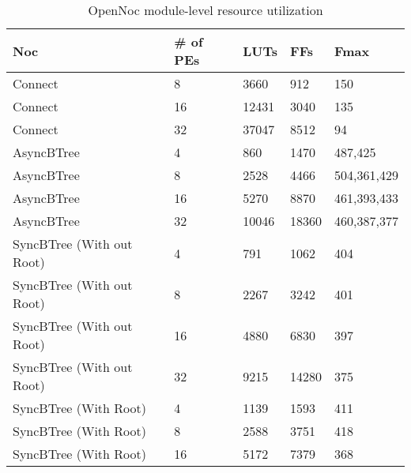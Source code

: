 \begin{table}[!t]
  \centering
  \caption{OpenNoc module-level resource utilization} 
  \begin{tabular}{l|l|l|l|l}
      \toprule
      Noc & \# of PEs & LUTs & FFs & Fmax \\
      \midrule
      \midrule
      Connect & 8      & 3660 & 912 & 150  \\
      Connect & 16     & 12431 & 3040 & 135 \\
      Connect & 32     & 37047 & 8512 & 94 \\    
      \midrule
      AsyncBTree & 4         & 860  & 1470 & 487,425\\
      AsyncBTree & 8         & 2528 & 4466 & 504,361,429\\
      AsyncBTree & 16        & 5270 & 8870 & 461,393,433 \\
      AsyncBTree & 32        & 10046 & 18360 & 460,387,377\\
      \midrule
      SyncBTree (With out Root) &  4         &  791 & 1062 & 404\\
      SyncBTree (With out Root) &  8         &  2267 & 3242 & 401\\
      SyncBTree (With out Root) &  16        &  4880 & 6830 & 397\\
      SyncBTree (With out Root) &  32        &  9215 & 14280 & 375\\
      \midrule      
      SyncBTree (With Root) &  4         &  1139 & 1593 & 411\\
      SyncBTree (With Root) &  8         &  2588 & 3751 & 418\\
      SyncBTree (With Root) &  16         &  5172 & 7379 & 368\\ 
      \bottomrule
    \end{tabular}
	\label{table:systemResourceConsumption}
\end{table}